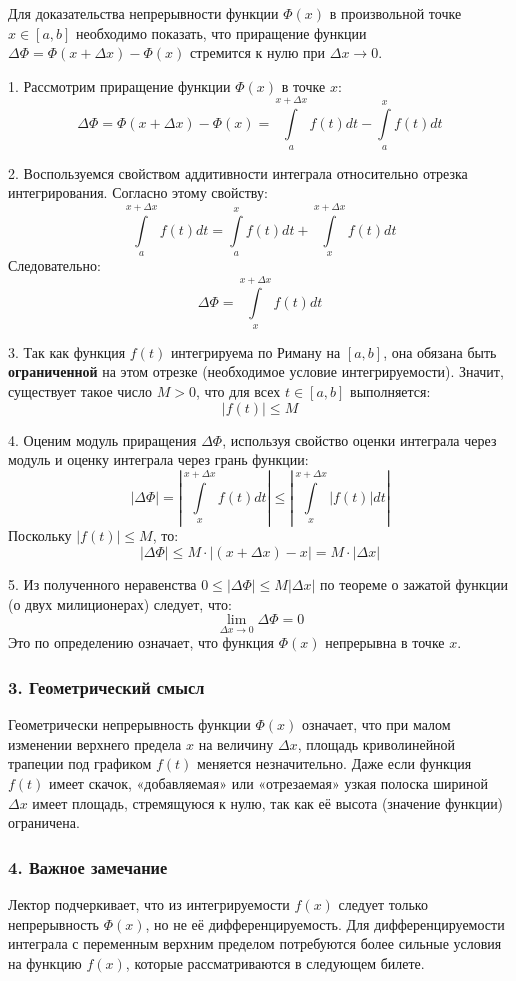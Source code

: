\begin{tcolorbox}[title=Доказательство, breakable]
Для доказательства непрерывности функции $\Phi(x)$ в произвольной точке $x \in [a, b]$ необходимо показать, что приращение функции $\Delta \Phi = \Phi(x + \Delta x) - \Phi(x)$ стремится к нулю при $\Delta x \to 0$.

1. Рассмотрим приращение функции $\Phi(x)$ в точке $x$:
\[ \Delta \Phi = \Phi(x + \Delta x) - \Phi(x) = \int\limits_a^{x + \Delta x} f(t) dt - \int\limits_a^x f(t) dt \]

2. Воспользуемся свойством аддитивности интеграла относительно отрезка интегрирования. Согласно этому свойству:
\[ \int\limits_a^{x + \Delta x} f(t) dt = \int\limits_a^x f(t) dt + \int\limits_x^{x + \Delta x} f(t) dt \]
Следовательно:
\[ \Delta \Phi = \int\limits_x^{x + \Delta x} f(t) dt \]

3. Так как функция $f(t)$ интегрируема по Риману на $[a, b]$, она обязана быть \textbf{ограниченной} на этом отрезке (необходимое условие интегрируемости). Значит, существует такое число $M > 0$, что для всех $t \in [a, b]$ выполняется:
\[ |f(t)| \le M \]

4. Оценим модуль приращения $\Delta \Phi$, используя свойство оценки интеграла через модуль и оценку интеграла через грань функции:
\[ |\Delta \Phi| = \left| \int\limits_x^{x + \Delta x} f(t) dt \right| \le \left| \int\limits_x^{x + \Delta x} |f(t)| dt \right| \]
Поскольку $|f(t)| \le M$, то:
\[ |\Delta \Phi| \le M \cdot |(x + \Delta x) - x| = M \cdot |\Delta x| \]

5. Из полученного неравенства $0 \le |\Delta \Phi| \le M |\Delta x|$ по теореме о зажатой функции (о двух милиционерах) следует, что:
\[ \lim_{\Delta x \to 0} \Delta \Phi = 0 \]
Это по определению означает, что функция $\Phi(x)$ непрерывна в точке $x$.
\end{tcolorbox}

\subsubsection*{3. Геометрический смысл}
Геометрически непрерывность функции $\Phi(x)$ означает, что при малом изменении верхнего предела $x$ на величину $\Delta x$, площадь криволинейной трапеции под графиком $f(t)$ меняется незначительно. Даже если функция $f(t)$ имеет скачок, «добавляемая» или «отрезаемая» узкая полоска шириной $\Delta x$ имеет площадь, стремящуюся к нулю, так как её высота (значение функции) ограничена.

\subsubsection*{4. Важное замечание}
Лектор подчеркивает, что из интегрируемости $f(x)$ следует только непрерывность $\Phi(x)$, но не её дифференцируемость. Для дифференцируемости интеграла с переменным верхним пределом потребуются более сильные условия на функцию $f(x)$, которые рассматриваются в следующем билете.

